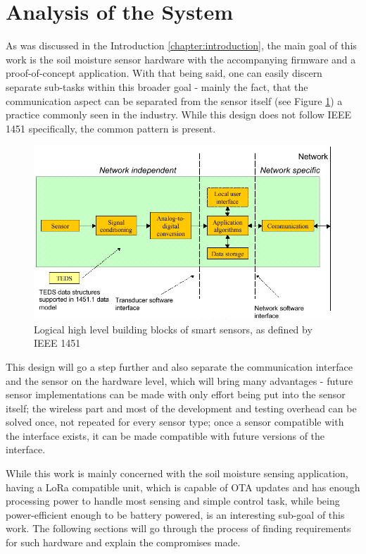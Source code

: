 
\section{Analysis of the System}
As was discussed in the Introduction \ref{chapter:introduction}, the main goal of this work is the soil moisture sensor hardware with the accompanying firmware and a proof-of-concept application. With that being said, one can easily discern separate sub-tasks within this broader goal - mainly the fact, that the communication aspect can be separated from the sensor itself (see Figure \ref{fig:device-split}) a practice commonly seen in the industry. While this design does not follow IEEE 1451 \cite{mark_ieee_nodate} specifically, the common pattern is present.

\begin{figure}
    \includegraphics[width=\textwidth]{fig/ieee-1451.png}
    \caption{\label{fig:device-split}Logical high level building blocks of smart sensors, as defined by IEEE 1451}
\end{figure}

This design will go a step further and also separate the communication interface and the sensor on the hardware level, which will bring many advantages - future sensor implementations can be made with only effort being put into the sensor itself; the wireless part and most of the development and testing overhead can be solved once, not repeated for every sensor type; once a sensor compatible with the interface exists, it can be made compatible with future versions of the interface.

While this work is mainly concerned with the soil moisture sensing application, having a LoRa compatible unit, which is capable of OTA updates and has enough processing power to handle most sensing and simple control task, while being power-efficient enough to be battery powered, is an interesting sub-goal of this work. The following sections will go through the process of finding requirements for such hardware and explain the compromises made.

